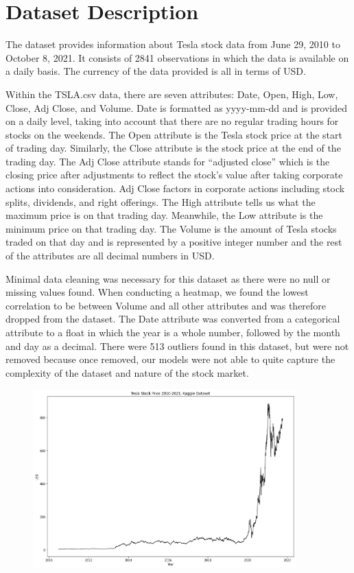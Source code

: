 \documentclass[12pt,a4paper]{article}
\begin{document}
\section{Dataset Description}
The dataset provides information about Tesla stock data from June 29, 2010 to October 8, 2021. It consists of 2841 observations in which the data is available on a daily basis. The currency of the data provided is all in terms of USD. 

Within the TSLA.csv data, there are seven attributes: Date, Open, High, Low, Close, Adj Close, and Volume. Date is formatted as yyyy-mm-dd and is provided on a daily level, taking into account that there are no regular trading hours for stocks on the weekends. The Open attribute is the Tesla stock price at the start of trading day. Similarly, the Close attribute is the stock price at the end of the trading day. The Adj Close attribute stands for “adjusted close” which is the closing price after adjustments to reflect the stock’s value after taking corporate actions into consideration. Adj Close factors in corporate actions including stock splits, dividends, and right offerings. The High attribute tells us what the maximum price is on that trading day. Meanwhile, the Low attribute is the minimum price on that trading day. The Volume is the amount of Tesla stocks traded on that day and is represented by a positive integer number and the rest of the attributes are all decimal numbers in USD. 

Minimal data cleaning was necessary for this dataset as there were no null or missing values found. When conducting a heatmap, we found the lowest correlation to be between Volume and all other attributes and was therefore dropped from the dataset. The Date attribute was converted from a categorical attribute to a float in which the year is a whole number, followed by the month and day as a decimal. There were 513 outliers found in this dataset, but were not removed because once removed, our models were not able to quite capture the complexity of the dataset and nature of the stock market. 

\begin{figure}[h]
\centering
\includegraphics[width=4in]{./Figures/TSLA.png}
\end{figure}
\end{document}
